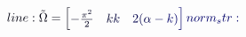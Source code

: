 \documentclass[12pt]{article}
\begin{document}
\makeatletter
\renewcommand*{\@textcolor}[3]{%
  \protect\leavevmode
  \begingroup
    \color#1{#2}#3%
  \endgroup
}
\makeatother
\begin{displaymath}
\mathcolor[RGB]{0,0,15}{line:
\Tilde{\Omega}=\begin{bmatrix}} \mathcolor[RGB]{0,0,30}{-\frac{\pi^2}{2}} & \mathcolor[RGB]{0,0,45}{k} \mathcolor[RGB]{0,0,60}{k} & \mathcolor[RGB]{0,0,75}{2(\alpha} \mathcolor[RGB]{0,0,90}{-} \mathcolor[RGB]{0,0,105}{k)\end{bmatrix}

norm_str:}
\end{displaymath}
\end{document}
